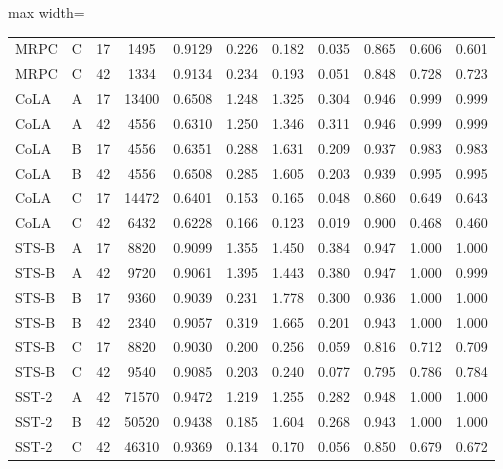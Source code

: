 \documentclass{article}
\begin{document}
\begin{table}[ht]
\begin{adjustbox}{max width=\linewidth}
\begin{tabular}{llccccccccc}
MRPC & C & 17 & 1495 & 0.9129 & 0.226 & 0.182 & 0.035 & 0.865 & 0.606 & 0.601 \\
MRPC & C & 42 & 1334 & 0.9134 & 0.234 & 0.193 & 0.051 & 0.848 & 0.728 & 0.723 \\
\midrule
CoLA & A & 17 & 13400 & 0.6508 & 1.248 & 1.325 & 0.304 & 0.946 & 0.999 & 0.999 \\
CoLA & A & 42 & 4556 & 0.6310 & 1.250 & 1.346 & 0.311 & 0.946 & 0.999 & 0.999 \\
CoLA & B & 17 & 4556 & 0.6351 & 0.288 & 1.631 & 0.209 & 0.937 & 0.983 & 0.983 \\
CoLA & B & 42 & 4556 & 0.6508 & 0.285 & 1.605 & 0.203 & 0.939 & 0.995 & 0.995 \\
CoLA & C & 17 & 14472 & 0.6401 & 0.153 & 0.165 & 0.048 & 0.860 & 0.649 & 0.643 \\
CoLA & C & 42 & 6432 & 0.6228 & 0.166 & 0.123 & 0.019 & 0.900 & 0.468 & 0.460 \\
\midrule
STS-B & A & 17 & 8820 & 0.9099 & 1.355 & 1.450 & 0.384 & 0.947 & 1.000 & 1.000 \\
STS-B & A & 42 & 9720 & 0.9061 & 1.395 & 1.443 & 0.380 & 0.947 & 1.000 & 0.999 \\
STS-B & B & 17 & 9360 & 0.9039 & 0.231 & 1.778 & 0.300 & 0.936 & 1.000 & 1.000 \\
STS-B & B & 42 & 2340 & 0.9057 & 0.319 & 1.665 & 0.201 & 0.943 & 1.000 & 1.000 \\
STS-B & C & 17 & 8820 & 0.9030 & 0.200 & 0.256 & 0.059 & 0.816 & 0.712 & 0.709 \\
STS-B & C & 42 & 9540 & 0.9085 & 0.203 & 0.240 & 0.077 & 0.795 & 0.786 & 0.784 \\
\midrule
SST-2 & A & 42 & 71570 & 0.9472 & 1.219 & 1.255 & 0.282 & 0.948 & 1.000 & 1.000 \\
SST-2 & B & 42 & 50520 & 0.9438 & 0.185 & 1.604 & 0.268 & 0.943 & 1.000 & 1.000 \\
SST-2 & C & 42 & 46310 & 0.9369 & 0.134 & 0.170 & 0.056 & 0.850 & 0.679 & 0.672 \\
\bottomrule
\end{tabular}
\end{adjustbox}
\end{table}
\end{document}
